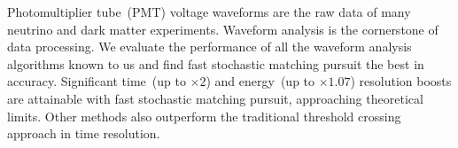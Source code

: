 Photomultiplier tube~(PMT) voltage waveforms are the raw data of many neutrino and dark matter experiments. Waveform analysis is the cornerstone of data processing. We evaluate the performance of all the waveform analysis algorithms known to us and find fast stochastic matching pursuit the best in accuracy. Significant time~(up to $\times 2$) and energy~(up to $\times 1.07$) resolution boosts are attainable with fast stochastic matching pursuit, approaching theoretical limits.  Other methods also outperform the traditional threshold crossing approach in time resolution.
